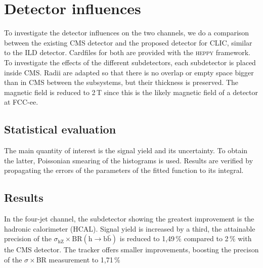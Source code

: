 \section{Detector influences}

To investigate the detector influences on the two channels, we do a comparison between the existing CMS detector and the proposed detector for CLIC, similar to the ILD detector. Cardfiles for both are provided with the \textsc{heppy} framework.
To investigate the effects of the different subdetectors, each subdetector is placed inside CMS. Radii are adapted so that there is no overlap or empty space bigger than in CMS between the subsystems, but their thickness is preserved. The magnetic field is reduced to 2\,T since this is the likely magnetic field of a detector at FCC-ee.

\subsection{Statistical evaluation}
The main quantity of interest is the signal yield and its uncertainty. To obtain the latter, Poissonian smearing of the histograms is used. Results are verified by propagating the errors of the parameters of the fitted function to its integral.

\subsection{Results}
In the four-jet channel, the subdetector showing the greatest improvement is the hadronic calorimeter (HCAL). Signal yield is increased by a third, the attainable precision of the $\sigma_\mathrm{hZ} \times \mathrm{BR(h \rightarrow b\bar{b})}$ is reduced to 1,49\,\% compared to 2\,\% with the CMS detector. The tracker offers smaller improvements, boosting the precison of the $\sigma \times $BR measurement to 1,71\,\%